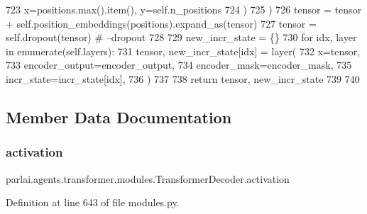 \begin{DoxyCode}
723                     x=positions.max().item(), y=self.n\_positions
724                 )
725             )
726         tensor = tensor + self.position\_embeddings(positions).expand\_as(tensor)
727         tensor = self.dropout(tensor)  \textcolor{comment}{# --dropout}
728 
729         new\_incr\_state = \{\}
730         \textcolor{keywordflow}{for} idx, layer \textcolor{keywordflow}{in} enumerate(self.layers):
731             tensor, new\_incr\_state[idx] = layer(
732                 x=tensor,
733                 encoder\_output=encoder\_output,
734                 encoder\_mask=encoder\_mask,
735                 incr\_state=incr\_state[idx],
736             )
737 
738         \textcolor{keywordflow}{return} tensor, new\_incr\_state
739 
740 
\end{DoxyCode}


\subsection{Member Data Documentation}
\mbox{\label{classparlai_1_1agents_1_1transformer_1_1modules_1_1TransformerDecoder_aced85fffc20320f29be295f94e686a63}} 
\subsubsection{\texorpdfstring{activation}{activation}}
{\footnotesize\ttfamily parlai.\+agents.\+transformer.\+modules.\+Transformer\+Decoder.\+activation}



Definition at line 643 of file modules.\+py.

\mbox{\label{classparlai_1_1agents_1_1transformer_1_1modules_1_1TransformerDecoder_ab29b2b4f3a44d3069d208c61ddba6f21}} 
